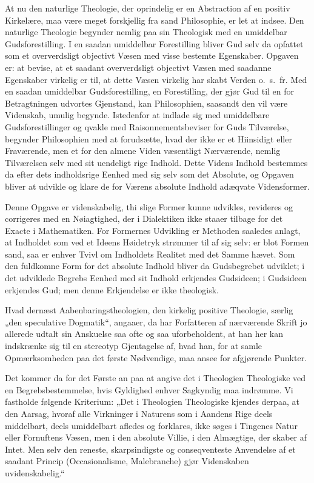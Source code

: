 \documentclass[12pt]{book}
\newcommand{\opage}[1]{\marginnote{\footnotesize\textit{[#1]}}}
\begin{document}
At nu den naturlige Theologie, der oprindelig er en Abstraction af en positiv Kirkelære, maa være meget forskjellig fra sand Philosophie, er let at indsee. Den naturlige Theologie begynder nemlig paa sin Theologisk med en umiddelbar Gudsforestilling. I en saadan umiddelbar Forestilling bliver Gud selv da opfattet som et oververdsligt objectivt Væsen med visse bestemte Egenskaber. Opgaven er: at bevise, at et saadant
\opage{XI}oververdsligt objectivt Væsen med saadanne Egenskaber virkelig er til, at dette Væsen virkelig har skabt Verden o.\ s.\ fr. Med en saadan umiddelbar Gudsforestilling, en Forestilling, der gjør Gud til en for Betragtningen udvortes Gjenstand, kan Philosophien, saasandt den vil være Videnskab, umulig begynde. Istedenfor at indlade sig med umiddelbare Gudsforestillinger og qvakle med Raisonnementsbeviser for Guds Tilværelse, begynder Philosophien med at forudsætte, hvad der ikke er et Hiinsidigt eller Fraværende, men et for den almene Viden væsentligt Nærværende, nemlig Tilværelsen selv med sit uendeligt rige Indhold. Dette Videns Indhold bestemmes da efter dets indholdsrige Eenhed med sig selv som det Absolute, og Opgaven bliver at udvikle og klare de for Værens absolute Indhold adæqvate Vidensformer.

Denne Opgave er videnskabelig, thi slige Former kunne udvikles, revideres og corrigeres med en Nøiagtighed, der i Dialektiken ikke staaer tilbage for det Exacte i Mathematiken. For Formernes Udvikling er Methoden saaledes anlagt, at Indholdet som ved et Ideens Høidetryk strømmer til af sig selv: er blot Formen sand, saa er enhver Tvivl om Indholdets Realitet med det Samme hævet. Som den fuldkomne Form for det absolute Indhold bliver da Gudsbegrebet udviklet; i det udviklede Begrebs Eenhed med sit Indhold erkjendes Gudsideen; i Gudsideen erkjendes Gud; men denne Erkjendelse er ikke theologisk.

Hvad dernæst Aabenbaringstheologien, den kirkelig positive Theologie, særlig „den speculative Dogmatik“, angaaer, da har Forfatteren af nærværende Skrift jo allerede udtalt sin Anskuelse saa ofte og saa uforbeholdent, at han her kan indskrænke sig til en stereotyp Gjentagelse af, hvad han, for at samle Opmærksomheden paa det første Nødvendige, maa ansee for afgjørende Punkter.

Det kommer da for det Første an paa at angive det i
\opage{XII}Theologien Theologiske ved en Begrebsbestemmelse, hvis Gyldighed enhver Sagkyndig maa indrømme. Vi fastholde følgende Kriterium: „Det i Theologien Theologiske kjendes derpaa, at den Aarsag, hvoraf alle Virkninger i Naturens som i Aandens Rige deels middelbart, deels umiddelbart afledes og forklares, ikke søges i Tingenes Natur eller Fornuftens Væsen, men i den absolute Villie, i den Almægtige, der skaber af Intet. Men selv den reneste, skarpsindigste og conseqventeste Anvendelse af et saadant Princip (Occasionalisme, Malebranche) gjør Videnskaben uvidenskabelig.“
\end{document}
